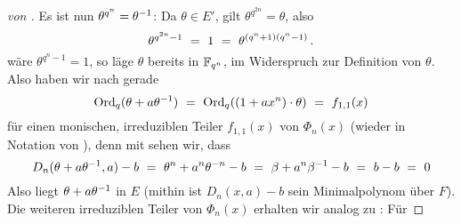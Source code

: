\begin{proof}[von ]
  Es ist nun $\theta^{q^n} = \theta^{-1}$: 
  Da $\theta \in E'$, gilt $\theta^{q^{2n}} = \theta$, also
  \[ \theta^{q^{2n}-1} \ =\  1 \ =\  \theta^{(q^n+1)(q^n-1)}\,. \]
  wäre $\theta^{q^n-1} = 1$, so läge $\theta$ bereits in $\mathbb{F}_{q^n}$, im Widerspruch
  zur Definition von $\theta$.
  Also haben wir nach  
  gerade 
  \[ \operatorname{Ord}_q(\theta + a\theta^{-1}) \ =\ 
    \operatorname{Ord}_q((1+ax^n)\cdot \theta) \ =\  f_{1,1}(x)\]
  für einen monischen, irreduziblen Teiler $f_{1,1}(x)$ von $\Phi_n(x)$
  (wieder in Notation von ), denn
  mit  sehen wir, dass
  \[ D_n(\theta + a\theta^{-1},a) -b \ =\  \theta^n + a^n\theta^{-n} -b
    \ =\  \beta +a^n\beta^{-1} -b \ =\  b - b\ =\  0\]
  Also liegt $\theta +a\theta^{-1}$ in $E$ (mithin ist $D_n(x,a)-b$ sein
  Minimalpolynom über $F$). Die weiteren irreduziblen Teiler von $\Phi_n(x)$
  erhalten wir analog zu : Für 

\end{proof}

